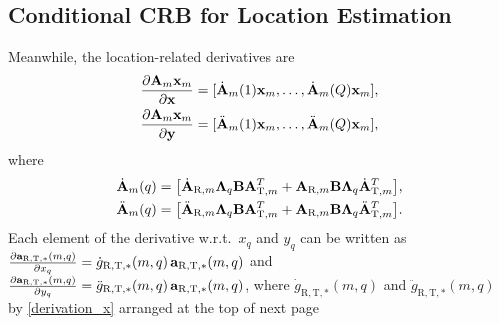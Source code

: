 \documentclass[9pt,final,journal,twocolumn]{IEEEtran}
\begin{document}
\subsection{Conditional CRB for Location Estimation}
\vspace{-0.1cm}
Meanwhile, the location-related derivatives are
\begin{subequations}\label{Derivation_loc_NB}
\begin{align}
  \frac{\partial{\bf A}_{m}{\bf x}_{m}}{\partial{\bf x}}
  &= [\dot{\bf A}_{m}(1){\bf x}_{m},\ldots,\dot{\bf A}_{m}(Q){\bf x}_{m}],\\
  \frac{\partial{\bf A}_{m}{\bf x}_{m}}{\partial{\bf y}}
  &= [\ddot{\bf A}_{m}(1){\bf x}_{m},\ldots,\ddot{\bf A}_{m}(Q){\bf x}_{m}],
\end{align}
\end{subequations}
where
\begin{align*}
\dot{\bf A}_{m}(q)
&=\big[{\dot{\bf A}_{\mathrm{R},m}}{\bf \Lambda}_{q}{\bf B}{\bf A}_{\mathrm{T},m}^{T}
+{\bf A}_{\mathrm{R},m}{\bf B}{\bf \Lambda}_{q}{\dot{\bf A}_{\mathrm{T},m}^{T}}\big],\\
\ddot{\bf A}_{m}(q)
&=\big[{\ddot{\bf A}_{\mathrm{R},m}}{\bf \Lambda}_{q}{\bf B}{\bf A}_{\mathrm{T},m}^{T}
+{\bf A}_{\mathrm{R},m}{\bf B}{\bf \Lambda}_{q}{\ddot{\bf A}_{\mathrm{T},m}^{T}}\big].
\end{align*}
Each element of the derivative w.r.t.\ $x_q$ and $y_q$ can be written as
$\frac{\partial{\bf a}_{\mathrm{R},\mathrm{T},\ast}(m,q)}{\partial x_q}
= \dot g_{\mathrm{R},\mathrm{T},\ast}(m,q)\,{\bf a}_{\mathrm{R},\mathrm{T},\ast}(m,q)$
and
$\frac{\partial{\bf a}_{\mathrm{R},\mathrm{T},\ast}(m,q)}{\partial y_q}
= \ddot g_{\mathrm{R},\mathrm{T},\ast}(m,q)\,{\bf a}_{\mathrm{R},\mathrm{T},\ast}(m,q)$,
where $\dot g_{\mathrm{R},\mathrm{T},\ast}(m,q)$ and $\ddot g_{\mathrm{R},\mathrm{T},\ast}(m,q)$
by \eqref{derivation_x} arranged at the top of next page
\end{document}
